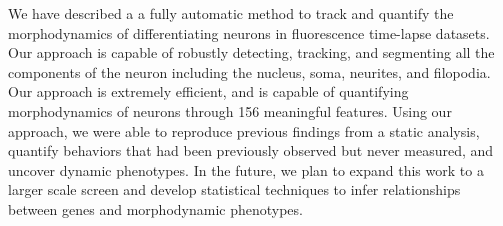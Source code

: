 We have described a  a  fully  automatic  method to  track  and  quantify  the
morphodynamics of  differentiating neurons in  fluorescence time-lapse
datasets.     Our  approach is capable of robustly detecting,
tracking, and segmenting all the  components of the neuron including 
the nucleus, soma, neurites, and filopodia.  Our approach is 
extremely efficient, and is capable of quantifying morphodynamics
of neurons through 156 meaningful features. Using our approach, we were 
able to reproduce previous findings from a static analysis, 
quantify behaviors that had been previously observed but never measured,
and uncover dynamic phenotypes. In the future, we plan to expand this
work to a larger scale screen and develop statistical techniques to 
infer relationships between genes and morphodynamic phenotypes.






